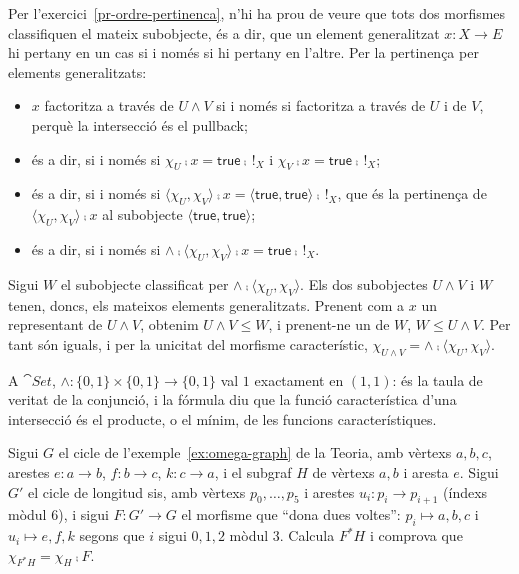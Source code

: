 \begin{solucio}
Per l'exercici~\ref{pr-ordre-pertinenca}, n'hi ha prou de veure que tots dos morfismes classifiquen el mateix subobjecte, és a dir, que un element generalitzat $x\colon X\to E$ hi pertany en un cas si i només si hi pertany en l'altre. Per la pertinença per elements generalitzats:
\begin{itemize}
  \item $x$ factoritza a través de $U\wedge V$ si i només si factoritza a través de $U$ i de $V$, perquè la intersecció és el pullback;
  \item és a dir, si i només si $\chi_U\comp x=\mathsf{true}\comp\,!_X$ i $\chi_V\comp x=\mathsf{true}\comp\,!_X$;
  \item és a dir, si i només si $\langle\chi_U,\chi_V\rangle\comp x=\langle\mathsf{true},\mathsf{true}\rangle\comp\,!_X$, que és la pertinença de $\langle\chi_U,\chi_V\rangle\comp x$ al subobjecte $\langle\mathsf{true},\mathsf{true}\rangle$;
  \item és a dir, si i només si $\wedge\comp\langle\chi_U,\chi_V\rangle\comp x=\mathsf{true}\comp\,!_X$.
\end{itemize}
Sigui $W$ el subobjecte classificat per $\wedge\comp\langle\chi_U,\chi_V\rangle$. Els dos subobjectes $U\wedge V$ i $W$ tenen, doncs, els mateixos elements generalitzats. Prenent com a $x$ un representant de $U\wedge V$, obtenim $U\wedge V\leq W$, i prenent-ne un de $W$, $W\leq U\wedge V$. Per tant són iguals, i per la unicitat del morfisme característic, $\chi_{U\wedge V}=\wedge\comp\langle\chi_U,\chi_V\rangle$.

A $\cat{Set}$, $\wedge\colon\{0,1\}\times\{0,1\}\to\{0,1\}$ val $1$ exactament en $(1,1)$: és la taula de veritat de la conjunció, i la fórmula diu que la funció característica d'una intersecció és el producte, o el mínim, de les funcions característiques.
\end{solucio}

\begin{exercici}\label{pr-reindexacio-graph}
Sigui $G$ el cicle de l'exemple~\ref{ex:omega-graph} de la Teoria, amb vèrtexs $a,b,c$, arestes $e\colon a\to b$, $f\colon b\to c$, $k\colon c\to a$, i el subgraf $H$ de vèrtexs $a,b$ i aresta $e$. Sigui $G'$ el cicle de longitud sis, amb vèrtexs $p_0,\dots,p_5$ i arestes $u_i\colon p_i\to p_{i+1}$ (índexs mòdul $6$), i sigui $F\colon G'\to G$ el morfisme que \enquote{dona dues voltes}: $p_i\mapsto a,b,c$ i $u_i\mapsto e,f,k$ segons que $i$ sigui $0,1,2$ mòdul $3$. Calcula $F^{*}H$ i comprova que $\chi_{F^{*}H}=\chi_H\comp F$.
\end{exercici}

